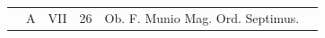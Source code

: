 \documentclass[openany]{book}
\renewcommand{\\}{\par\hspace*{.1em}} %
\begin{document}
\begin{center}
\begin{tabular}{l | l | l | r | l l}
\color{Red}  & \color{Red} A & \color{Red} VII & 26 & Ob. F. Munio Mag. Ord. Septimus. & \color{Red} \\



\end{tabular}
\end{center}
\end{document}
